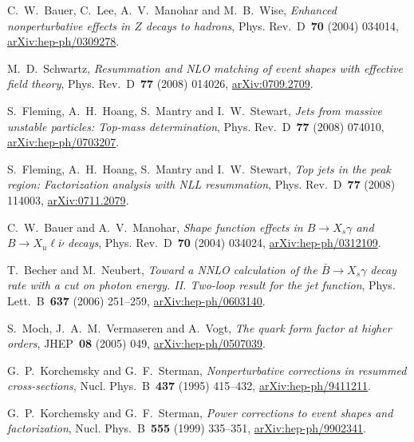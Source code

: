 C.~W.~Bauer, C.~Lee, A.~V.~Manohar and M.~B.~Wise, \emph{Enhanced nonperturbative effects in $Z$ decays to hadrons}, Phys. Rev.~D~\textbf{70} (2004) \mbox{034014}, \href{https://arxiv.org/abs/hep-ph/0309278}{arXiv:hep-ph/0309278}.

M.~D.~Schwartz, \emph{Resummation and NLO matching of event shapes with effective field theory}, Phys. Rev.~D~\textbf{77} (2008) \mbox{014026}, \href{https://arxiv.org/abs/0709.2709}{arXiv:0709.2709}.

S.~Fleming, A.~H.~Hoang, S.~Mantry and I.~W.~Stewart, \emph{Jets from massive unstable particles: Top-mass determination}, Phys. Rev.~D~\textbf{77} (2008) \mbox{074010}, \href{https://arxiv.org/abs/hep-ph/0703207}{arXiv:hep-ph/0703207}.

S.~Fleming, A.~H.~Hoang, S.~Mantry and I.~W.~Stewart, \emph{Top jets in the peak region: Factorization analysis with NLL resummation}, Phys. Rev.~D~\textbf{77} (2008) \mbox{114003}, \href{https://arxiv.org/abs/0711.2079}{arXiv:0711.2079}.

C.~W.~Bauer and A.~V.~Manohar, \emph{Shape function effects in $B\to X_s\gamma$ and $B\to X_u\ell\bar\nu$ decays}, Phys. Rev.~D~\textbf{70} (2004) \mbox{034024}, \href{https://arxiv.org/abs/hep-ph/0312109}{arXiv:hep-ph/0312109}.

T.~Becher and M.~Neubert, \emph{Toward a NNLO calculation of the $\bar B\to X_s\gamma$ decay rate with a cut on photon energy. II. Two-loop result for the jet function}, Phys. Lett.~B~\textbf{637} (2006) \mbox{251--259}, \href{https://arxiv.org/abs/hep-ph/0603140}{arXiv:hep-ph/0603140}.

S.~Moch, J.~A.~M.~Vermaseren and A.~Vogt, \emph{The quark form factor at higher orders}, JHEP~\textbf{08} (2005) \mbox{049}, \href{https://arxiv.org/abs/hep-ph/0507039}{arXiv:hep-ph/0507039}.

G.~P.~Korchemsky and G.~F.~Sterman, \emph{Nonperturbative corrections in resummed cross-sections}, Nucl. Phys.~B~\textbf{437} (1995) \mbox{415--432}, \href{https://arxiv.org/abs/hep-ph/9411211}{arXiv:hep-ph/9411211}.

G.~P.~Korchemsky and G.~F.~Sterman, \emph{Power corrections to event shapes and factorization}, Nucl. Phys.~B~\textbf{555} (1999) \mbox{335--351}, \href{https://arxiv.org/abs/hep-ph/9902341}{arXiv:hep-ph/9902341}.

